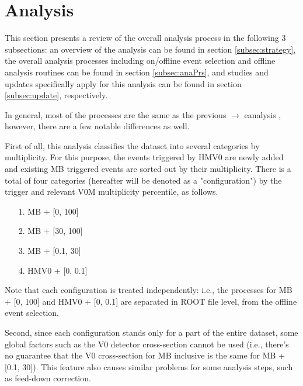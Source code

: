 \section{Analysis}\label{sec:ana}
\vspace{\columnsep}

This section presents a review of the overall analysis process in the following 3 subsections:
an overview of the analysis can be found in section \ref{subsec:strategy}, the overall analysis processes including on/offline event selection and offline analysis routines can be found in section \ref{subsec:anaPrs}, and studies and updates specifically apply for this analysis can be found in section \ref{subsec:update}, respectively.

In general, most of the processes are the same as the previous \Xic $\rightarrow$ e\Xim analysis \cite{ana990_Xic0}, however, there are a few notable differences as well.

First of all, this analysis classifies the  \TeV dataset into several categories by multiplicity. For this purpose, the events triggered by HMV0 are newly added and existing MB triggered events are sorted out by their multiplicity. There is a total of four categories (hereafter will be denoted as a "configuration") by the trigger and relevant V0M multiplicity percentile, as follows.

\begin{itemize}
    \small
    \item[]  \vspace{1pt}
    \item[1.] MB + [0, 100]
    \item[2.] MB + [30, 100]
    \item[3.] MB + [0.1, 30]
    \item[4.] HMV0 + [0, 0.1]
\end{itemize}

Note that each configuration is treated independently: i.e., the processes for MB + [0, 100] and HMV0 + [0, 0.1] are separated in ROOT file level, from the offline event selection.

Second, since each configuration stands only for a part of the entire dataset, some global factors such as the V0 detector cross-section cannot be used (i.e., there's no guarantee that the V0 cross-section for MB inclusive is the same for MB + [0.1, 30]). This feature also causes similar problems for some analysis steps, such as feed-down correction.

